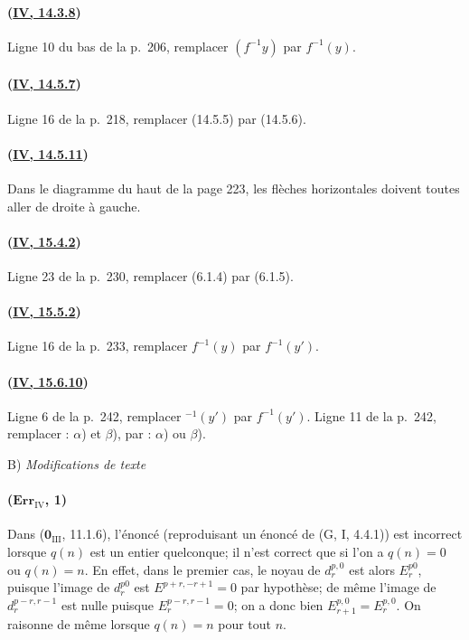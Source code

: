 \paragraph{({\texorpdfstring{\protect\hyperref[canon-index.ega4.c04.prop.14-3-8]{IV, 14.3.8}}{IV, 14.3.8}})}
Ligne 10 du bas de la p.~206, remplacer $(f^{-1}y)$ par $f^{-1}(y)$.

\paragraph{({\texorpdfstring{\protect\hyperref[canon-index.ega4.c04.rem.14-5-7]{IV, 14.5.7}}{IV, 14.5.7}})}
Ligne 16 de la p.~218, remplacer (14.5.5) par (14.5.6).

\paragraph{({\texorpdfstring{\protect\hyperref[canon-index.ega4.c04.cor.14-5-11]{IV, 14.5.11}}{IV, 14.5.11}})}
Dans le diagramme du haut de la page 223, les flèches horizontales
doivent toutes aller de droite à gauche.

\paragraph{({\texorpdfstring{\protect\hyperref[canon-index.ega4.c04.prop.15-4-2]{IV, 15.4.2}}{IV, 15.4.2}})}
Ligne 23 de la p.~230, remplacer (6.1.4) par (6.1.5).

\paragraph{({\texorpdfstring{\protect\hyperref[canon-index.ega4.c04.cor.15-5-2]{IV, 15.5.2}}{IV, 15.5.2}})}
Ligne 16 de la p.~233, remplacer $f^{-1}(y)$ par $f^{-1}(y')$.

\paragraph{({\texorpdfstring{\protect\hyperref[canon-index.ega4.c04.item.15-6-10]{IV, 15.6.10}}{IV, 15.6.10}})}
Ligne 6 de la p.~242, remplacer ${}^{-1}(y')$ par $f^{-1}(y')$.
Ligne 11 de la p.~242, remplacer : $\alpha$) et $\beta$), par :
$\alpha$) ou $\beta$).

\begin{center}
B) \emph{Modifications de texte}
\end{center}

\paragraph{($\mathbf{Err}_{\mathrm{IV}}$, 1)}
Dans ($\mathbf{0}_{\mathrm{III}}$, 11.1.6), l'énoncé (reproduisant un énoncé de
(G, I, 4.4.1)) est incorrect lorsque $q(n)$ est un entier quelconque;
il n'est correct que si l'on a $q(n)=0$ ou $q(n)=n$. En effet, dans le
premier cas, le noyau de $d_r^{p,0}$ est alors $E_r^{p0}$, puisque
l'image de $d_r^{p0}$ est $E^{p+r,-r+1}=0$ par hypothèse; de même
l'image de $d_r^{p-r,r-1}$ est nulle puisque
$E_r^{p-r,r-1}=0$; on a donc bien $E_{r+1}^{p,0}=E_r^{p,0}$. On
raisonne de même lorsque $q(n)=n$ pour tout $n$.

